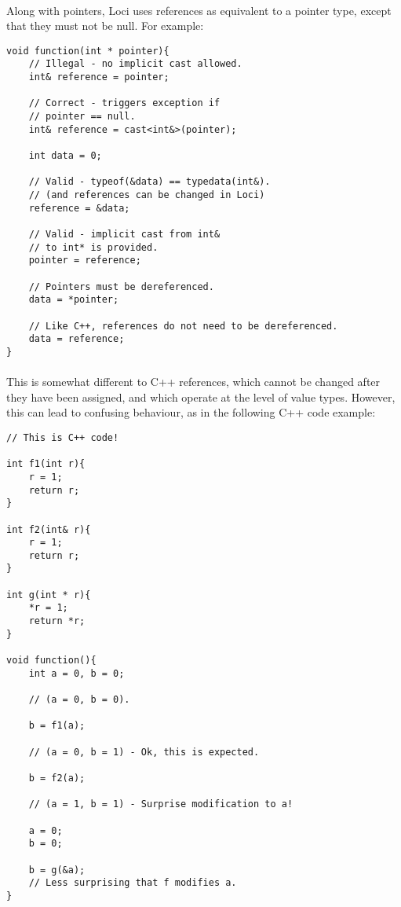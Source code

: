 \documentclass[12pt,twoside,notitlepage]{report}
\begin{document}
\paragraph{}
Along with pointers, Loci uses references as equivalent to a pointer type, except that they must not be null. For example:

\small{
\begin{verbatim}
void function(int * pointer){
    // Illegal - no implicit cast allowed.
    int& reference = pointer;
    
    // Correct - triggers exception if
    // pointer == null.
    int& reference = cast<int&>(pointer);
    
    int data = 0;
    
    // Valid - typeof(&data) == typedata(int&).
    // (and references can be changed in Loci)
    reference = &data;
    
    // Valid - implicit cast from int&
    // to int* is provided.
    pointer = reference;
    
    // Pointers must be dereferenced.
    data = *pointer;
    
    // Like C++, references do not need to be dereferenced.
    data = reference;
}
\end{verbatim}
}

\paragraph{}
This is somewhat different to C++ references, which cannot be changed after they have been assigned, and which operate at the level of value types. However, this can lead to confusing behaviour, as in the following C++ code example:

\small{
\begin{verbatim}
// This is C++ code!

int f1(int r){
    r = 1;
    return r;
}

int f2(int& r){
    r = 1;
    return r;
}

int g(int * r){
    *r = 1;
    return *r;
}

void function(){
    int a = 0, b = 0;
    
    // (a = 0, b = 0).
    
    b = f1(a);
    
    // (a = 0, b = 1) - Ok, this is expected.
    
    b = f2(a);
    
    // (a = 1, b = 1) - Surprise modification to a!
    
    a = 0;
    b = 0;
    
    b = g(&a);
    // Less surprising that f modifies a.
}
\end{verbatim}
}
\end{document}
